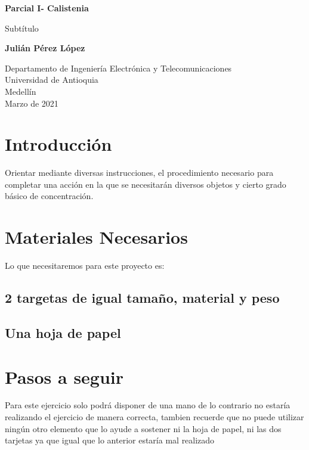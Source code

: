\documentclass{article}
\begin{document}
\begin{titlepage}
    \begin{center}
        \vspace*{1cm}
            
        \Huge
        \textbf{Parcial I- Calistenia}
            
        \vspace{0.5cm}
        \LARGE
        Subtítulo
            
        \vspace{1.5cm}
            
        \textbf{Julián Pérez López}
            
        \vfill
            
        \vspace{0.8cm}
            
        \LARGE
        Departamento de Ingeniería Electrónica y Telecomunicaciones\\
        Universidad de Antioquia\\
        Medellín\\
        Marzo de 2021
            
    \end{center}
\end{titlepage}

\tableofcontents
\newpage
\section{Introducción}\label{intro}
Orientar mediante diversas instrucciones, el procedimiento necesario para completar una acción en la que se necesitarán diversos objetos y cierto grado básico de concentración.
\section{Materiales Necesarios} \label{contenido}
Lo que necesitaremos para este proyecto es: 
\subsection{2 targetas de igual tamaño, material y peso}
\subsection{Una hoja de papel}

\section{Pasos a seguir} 
Para este ejercicio solo podrá disponer de una mano de lo contrario no estaría realizando el ejercicio de manera correcta, tambien recuerde que no puede utilizar ningún otro elemento que lo ayude a sostener ni la hoja de papel, ni las dos tarjetas ya que igual que lo anterior estaría mal realizado \\
\end{document}
